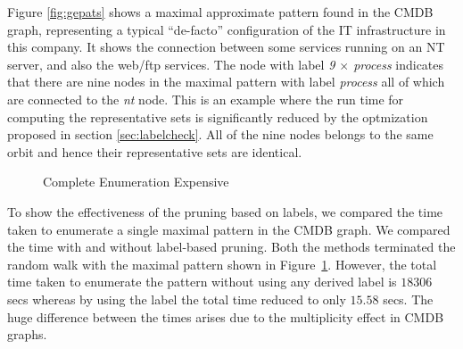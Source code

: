 \smallskip{}
Figure \ref{fig:gepats} shows a maximal approximate
pattern found in the CMDB graph, representing a
typical ``de-facto'' 
configuration of the IT infrastructure in this company. It shows the
connection between some services running on an NT server, and also the
web/ftp services. The node with label \textit{9 $\times$ process} 
indicates that there are nine nodes 
in the maximal pattern with label \textit{process} all of which
are connected to the \textit{nt} node. This is an example where the run time
for computing the representative sets is significantly reduced by
the optmization proposed in section \ref{sec:labelcheck}. All of the nine
nodes belongs to the same orbit and hence their representative sets are
identical.


\begin{figure}
    \centering
    \caption{Complete Enumeration Expensive}
    \label{fig:geex}
\end{figure}

To show the effectiveness of the pruning based on labels, we compared
the time taken to enumerate a single maximal pattern in the CMDB graph.
We compared the time with and without label-based pruning.
Both the methods terminated the random walk with the maximal pattern
shown in Figure~\ref{fig:geex}.  
However, the total time taken to enumerate the pattern
without using any derived label is $18306$ secs whereas by using the
\ncl label the total time reduced to only $15.58$ secs. The huge
difference between the times arises due to the multiplicity effect in
CMDB graphs.  


